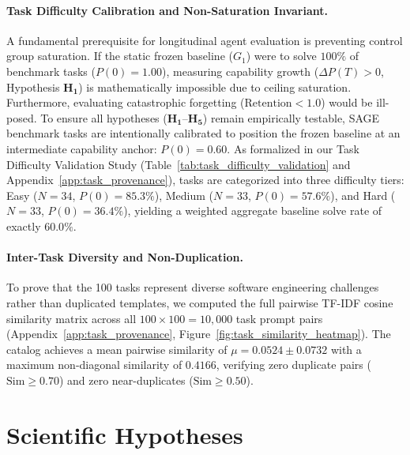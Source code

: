 \documentclass{article}
\begin{document}
\paragraph{Task Difficulty Calibration and Non-Saturation Invariant.} A fundamental prerequisite for longitudinal agent evaluation is preventing control group saturation. If the static frozen baseline ($G_1$) were to solve $100\%$ of benchmark tasks ($P(0) = 1.00$), measuring capability growth ($\Delta P(T) > 0$, Hypothesis $\mathbf{H_1}$) is mathematically impossible due to ceiling saturation. Furthermore, evaluating catastrophic forgetting ($\text{Retention} < 1.0$) would be ill-posed. To ensure all hypotheses ($\mathbf{H_1}$--$\mathbf{H_5}$) remain empirically testable, SAGE benchmark tasks are intentionally calibrated to position the frozen baseline at an intermediate capability anchor: $P(0) = 0.60$. As formalized in our Task Difficulty Validation Study (Table~\ref{tab:task_difficulty_validation} and Appendix~\ref{app:task_provenance}), tasks are categorized into three difficulty tiers: Easy ($N=34$, $P(0) = 85.3\%$), Medium ($N=33$, $P(0) = 57.6\%$), and Hard ($N=33$, $P(0) = 36.4\%$), yielding a weighted aggregate baseline solve rate of exactly $60.0\%$.

\paragraph{Inter-Task Diversity and Non-Duplication.} To prove that the 100 tasks represent diverse software engineering challenges rather than duplicated templates, we computed the full pairwise TF-IDF cosine similarity matrix across all $100 \times 100 = 10{,}000$ task prompt pairs (Appendix~\ref{app:task_provenance}, Figure~\ref{fig:task_similarity_heatmap}). The catalog achieves a mean pairwise similarity of $\mu = 0.0524 \pm 0.0732$ with a maximum non-diagonal similarity of $0.4166$, verifying zero duplicate pairs ($\text{Sim} \ge 0.70$) and zero near-duplicates ($\text{Sim} \ge 0.50$).

\section{Scientific Hypotheses}
\label{sec:hypotheses}
\end{document}
